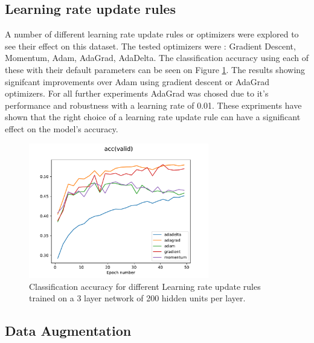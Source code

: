 \documentclass[12pt]{article}
\begin{document}
\subsection*{Learning rate update rules}

A number of different learning rate update rules or optimizers were explored to see their effect on this dataset. The tested optimizers were : Gradient Descent, Momentum, Adam\cite{Adam}, AdaGrad\cite{Ada}, AdaDelta\cite{AdaD}. The classification accuracy using each of these with their default parameters can be seen on Figure \ref{fig:opt}. The results showing signifcant improvements over Adam using  gradient descent or AdaGrad optimizers. For all further experiments AdaGrad was chosed due to it's performance and robustness with a learning rate of 0.01. These expriments have shown that the right choice of a learning rate update rule can have a significant effect on the model's accuracy.

\begin{figure}[H]
\centering
\includegraphics[width=0.7\textwidth]{optimization.pdf}

  \caption{Classification accuracy for different Learning rate update rules trained on a 3 layer network of 200 hidden units per layer.}
  \label{fig:opt}
\end{figure}

\subsection*{Data Augmentation}
\end{document}
